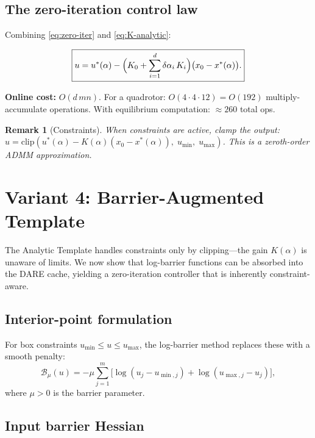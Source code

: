 \documentclass[11pt]{article}
\newtheorem{remark}[theorem]{Remark}
\newcommand{\clip}{\mathrm{clip}}
\begin{document}
\subsection{The zero-iteration control law}

Combining \eqref{eq:zero-iter}
and \eqref{eq:K-analytic}:

\begin{equation}\label{eq:brutal}
\boxed{
  u = u^*(\alpha)
  - \Bigl(K_0 + \sum_{i=1}^{d}
    \delta\alpha_i\, K_i\Bigr)
  \bigl(x_0 - x^*(\alpha)\bigr).
}
\end{equation}

\noindent
\textbf{Online cost:} $O(d\,mn)$.
For a quadrotor: $O(4 \cdot 4 \cdot 12) = O(192)$
multiply-accumulate operations.
With equilibrium computation: $\approx 260$ total ops.

\begin{remark}[Constraints]\label{rem:constraints}
When constraints are active, clamp the output:
$u = \clip(u^*(\alpha) - K(\alpha)(x_0 - x^*(\alpha)),
\; u_{\min},\; u_{\max})$.
This is a zeroth-order ADMM approximation.
\end{remark}

\section{Variant 4: Barrier-Augmented Template}
\label{sec:barrier}

The Analytic Template handles constraints only by
clipping---the gain $K(\alpha)$ is unaware of limits.
We now show that log-barrier functions can be
absorbed into the DARE cache, yielding a zero-iteration
controller that is inherently constraint-aware.

\subsection{Interior-point formulation}

For box constraints $u_{\min} \le u \le u_{\max}$,
the log-barrier method replaces these with a smooth penalty:
\begin{equation}\label{eq:barrier}
  \mathcal{B}_\mu(u) = -\mu \sum_{j=1}^{m}
    \bigl[\log(u_j - u_{\min,j})
          + \log(u_{\max,j} - u_j)\bigr],
\end{equation}
where $\mu > 0$ is the barrier parameter.

\subsection{Input barrier Hessian}
\end{document}

